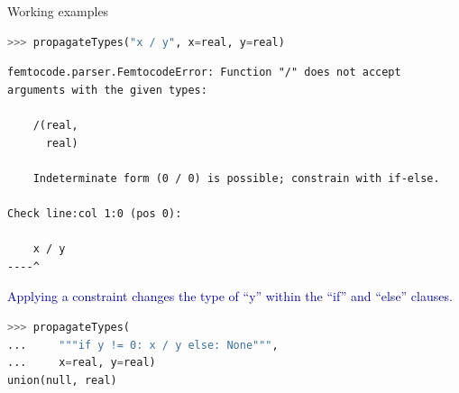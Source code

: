 \documentclass{beamer}
\begin{document}
\begin{frame}[fragile]{Working examples}
\vspace{0.2 cm}
\begin{lstlisting}[language=python]
>>> propagateTypes("x / y", x=real, y=real)
\end{lstlisting}
\color{red}
\begin{lstlisting}[basicstyle=\ttfamily\scriptsize]
femtocode.parser.FemtocodeError: Function "/" does not accept arguments with the given types:

    /(real,
      real)

    Indeterminate form (0 / 0) is possible; constrain with if-else.

Check line:col 1:0 (pos 0):

    x / y
----^
\end{lstlisting}

\textcolor{darkblue}{Applying a constraint changes the type of ``y'' within the ``if'' and ``else'' clauses.}
\color{black}
\begin{lstlisting}[language=python]
>>> propagateTypes(
...     """if y != 0: x / y else: None""",
...     x=real, y=real)
union(null, real)
\end{lstlisting}
\end{frame}
\end{document}
